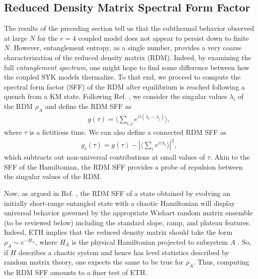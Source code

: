 \documentclass[reprint, floatfix,eqsecnum,superscriptaddress,preprint,nofootinbib,onecolumn,amsmath,amssymb,aps,prb]{revtex4-2}
\begin{document}
\subsection{Reduced Density Matrix Spectral Form Factor \label{sec:rdm-sff} }

The results of the preceding section tell us that the subthermal behavior observed at large $N$ for the $r=4$ coupled model does not appear to persist down to finite $N$. However, entanglement entropy, as a single number, provides a very coarse characterization of the reduced density matrix (RDM). Indeed, by examining the full \emph{entanglement spectrum}, one might hope to find some difference between how the coupled SYK models thermalize. To that end, we proceed to compute the spectral form factor (SFF) of the RDM after equilibrium is reached following a quench from a KM state. Following Ref. \cite{Chen2018}, we consider the singular values $\lambda_i$ of the RDM $\rho_A$ and define the RDM SFF as
\begin{align}
    g(\tau) = \langle \sum_{i,j} e^{i\tau(\lambda_i - \lambda_j)} \rangle,
\end{align}
where $\tau$ is a fictitious time. We can also define a connected RDM SFF as
\begin{align}
    g_c(\tau) = g(\tau) - |\langle \sum_i e^{i\tau\lambda_i} \rangle|^2,
\end{align}
which subtracts out non-universal contributions at small values of $\tau$. Akin to the SFF of the Hamiltonian, the RDM SFF provides a probe of repulsion between the singular values of the RDM.

Now, as argued in Ref. \cite{Chen2018}, the RDM SFF of a state obtained by evolving an initially short-range entangled state with a chaotic Hamiltonian will display universal behavior governed by the appropriate Wishart random matrix ensemble (to be reviewed below) including the standard slope, ramp, and plateau features. 
Indeed, ETH implies that the reduced density matrix should take the form $\rho_A \sim e^{-H_A}$, where $H_A$ is the physical Hamiltonian projected to subsystem $A$ \cite{Garrison2018}. So, if $H$ describes a chaotic system and hence has level statistics described by random matrix theory, one expects the same to be true for $\rho_A$. Thus, computing the RDM SFF amounts to a finer test of ETH. 
\end{document}
